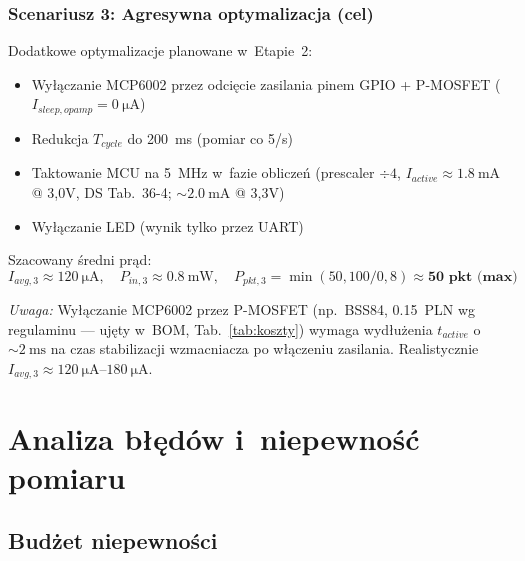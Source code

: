 \documentclass[a4paper,11pt]{article}
\begin{document}
	\subsubsection{Scenariusz 3: Agresywna optymalizacja (cel)}
	
	Dodatkowe optymalizacje planowane w~Etapie~2:
	\begin{itemize}[nosep]
		\item Wyłączanie MCP6002 przez odcięcie zasilania pinem GPIO + P-MOSFET
		($I_{sleep,opamp} = \SI{0}{\micro\ampere}$)
		\item Redukcja $T_{cycle}$ do \SI{200}{\milli\second} (pomiar co 5/s)
		\item Taktowanie MCU na \SI{5}{\mega\hertz} w~fazie obliczeń
		(prescaler $\div 4$, $I_{active} \approx \SI{1,8}{\milli\ampere}$ @ 3{,}0V, DS Tab.~36-4; ${\sim}\SI{2,0}{\milli\ampere}$ @ 3{,}3V)
		\item Wyłączanie LED (wynik tylko przez UART)
	\end{itemize}
	
	Szacowany średni prąd:
	\begin{equation}
		I_{avg,3} \approx \SI{120}{\micro\ampere}, \quad
		P_{in,3} \approx \SI{0,8}{\milli\watt}, \quad
		P_{pkt,3} = \min(50, 100/0{,}8) \approx \textbf{50~pkt~(max)}
		\label{eq:moc_scen3}
	\end{equation}
	
	\textit{Uwaga:} Wyłączanie MCP6002 przez P-MOSFET (np.\ BSS84, \SI{0,15}{PLN} wg regulaminu
	--- ujęty w~BOM, Tab.~\ref{tab:koszty}) wymaga wydłużenia
	$t_{active}$ o~${\sim}\SI{2}{\milli\second}$ na czas stabilizacji wzmacniacza
	po włączeniu zasilania. Realistycznie $I_{avg,3} \approx \SIrange{120}{180}{\micro\ampere}$.
	
	
	\section{Analiza błędów i~niepewność pomiaru}
	\label{sec:bledy}
	
	\subsection{Budżet niepewności}
	
\end{document}
